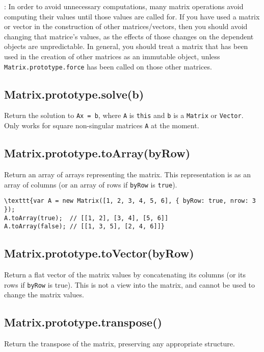 \documentclass{article}
\begin{document}
: In order to avoid unnecessary computations, many matrix operations avoid
computing their values until those values are called for. If you have used a matrix or
vector in the construction of other matrices/vectors, then you should avoid changing
that matrice's values, as the effects of those changes on the dependent objects are
unpredictable. In general, you should treat a matrix that has been used in the creation
of other matrices as an immutable object, unless \texttt{Matrix.prototype.force} has been called
on those other matrices.


    \subsection*{Matrix.prototype.solve(b)}
    Return the solution to \texttt{Ax = b}, where \texttt{A} is \texttt{this} and  \texttt{b} is a \texttt{Matrix} or \texttt{Vector}.
Only works for square non-singular matrices \texttt{A} at the moment.


    \subsection*{Matrix.prototype.toArray(byRow)}
    Return an array of arrays representing the matrix. This representation is
as an array of columns (or an array of rows if \texttt{byRow} is \texttt{true}).


\begin{lstlisting}
\texttt{var A = new Matrix([1, 2, 3, 4, 5, 6], { byRow: true, nrow: 3 });
A.toArray(true);  // [[1, 2], [3, 4], [5, 6]]
A.toArray(false); // [[1, 3, 5], [2, 4, 6]]}\end{lstlisting}

    \subsection*{Matrix.prototype.toVector(byRow)}
    Return a flat vector of the matrix values by concatenating its
columns (or its rows if \texttt{byRow} is true). This is not a view into
the matrix, and cannot be used to change the matrix values.


    \subsection*{Matrix.prototype.transpose()}
    Return the transpose of the matrix, preserving any appropriate structure.
\end{document}
